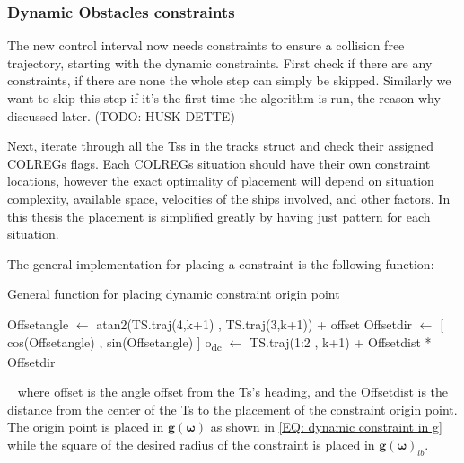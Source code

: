 \subsubsection*{Dynamic Obstacles constraints}
The new control interval now needs constraints to ensure a collision free trajectory, starting with the dynamic constraints.
First check if there are any constraints, if there are none the whole step can simply be skipped. Similarly we want to skip
this step if it's the first time the algorithm is run, the reason why discussed later. (TODO: HUSK DETTE)

Next, iterate through all the \gls{Ts}s in the tracks struct and check their assigned COLREGs flags.
Each COLREGs situation should have their own constraint locations, however the exact optimality of placement
will depend on situation complexity, available space, velocities of the ships involved, and other factors. In
this thesis the placement is simplified greatly by having just pattern for each situation.

The general implementation for placing a constraint is the following function:
\begin{algorithm}[ht]
    \caption{General function for placing dynamic constraint origin point}
    \label{ALG: dynamic constraint origin}
    \begin{algorithmic}
        \State Offsetangle $\gets$ atan2(TS.traj(4,k+1) , TS.traj(3,k+1)) + offset
        \State Offsetdir $\gets$ [ cos(Offsetangle) , sin(Offsetangle) ]
        \State o\textsubscript{dc} $\gets$ TS.traj(1:2 , k+1) + Offsetdist * Offsetdir
    \end{algorithmic}
\end{algorithm}
 \newline
where offset is the angle offset from the \gls{Ts}'s heading, and the Offsetdist is the distance from the center of the
\gls{Ts} to the placement of the constraint origin point. The origin point is placed in $\textbf{g}(\bm{\omega})$
as shown in \eqref{EQ: dynamic constraint in g} while the square of the desired radius of the constraint is placed in
$\textbf{g}(\bm{\omega})_{lb}$.

